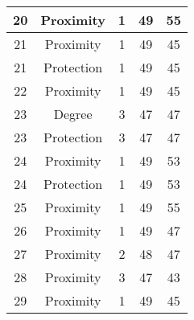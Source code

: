 \documentclass[results.tex]{subfiles}
\begin{document}
\begin{center}
\begin{tabular}{| c || c | c | c | c |}
            \hline
            20                      & Proximity                    & 1                      & 49                      & 55                   \\
            \hline
            21                      & Proximity                    & 1                      & 49                      & 45                   \\
            \hline
            21                      & Protection                   & 1                      & 49                      & 45                   \\
            \hline
            22                      & Proximity                    & 1                      & 49                      & 45                   \\
            \hline
            23                      & Degree                       & 3                      & 47                      & 47                   \\
            \hline
            23                      & Protection                   & 3                      & 47                      & 47                   \\
            \hline
            24                      & Proximity                    & 1                      & 49                      & 53                   \\
            \hline
            24                      & Protection                   & 1                      & 49                      & 53                   \\
            \hline
            25                      & Proximity                    & 1                      & 49                      & 55                   \\
            \hline
            26                      & Proximity                    & 1                      & 49                      & 47                   \\
            \hline
            27                      & Proximity                    & 2                      & 48                      & 47                   \\
            \hline
            28                      & Proximity                    & 3                      & 47                      & 43                   \\
            \hline
            29                      & Proximity                    & 1                      & 49                      & 45                   \\

\end{tabular}
\end{center}
\end{document}
